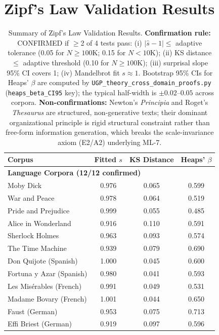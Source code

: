\documentclass[11pt]{article}
\begin{document}
\section{Zipf's Law Validation Results}
\begin{table}[h!]
    \centering
    \caption{Summary of Zipf's Law Validation Results. \textbf{Confirmation rule:} CONFIRMED if $\geq$2 of 4 tests pass: (i) $|\hat{s}-1|\leq$ adaptive tolerance (0.05 for $N\geq 100$K; 0.15 for $N<10$K); (ii) KS distance $\leq$ adaptive threshold (0.10 for $N\geq 100$K); (iii) surprisal slope 95\% CI covers 1; (iv) Mandelbrot fit $s\approx 1$. Bootstrap 95\% CIs for Heaps' $\beta$ are computed by \texttt{UGP\_theory\_cross\_domain\_proofs.py} (\texttt{heaps\_beta\_CI95} key); the typical half-width is $\pm 0.02$--$0.05$ across corpora. \textbf{Non-confirmations:} Newton's \emph{Principia} and Roget's \emph{Thesaurus} are structured, non-generative texts; their dominant organizational principle is rigid structural constraint rather than free-form information generation, which breaks the scale-invariance axiom (E2/A2) underlying ML-7.}
    \label{tab:zipf-summary}
    \tiny
    \begin{tabular}{@{}lccc@{}}
        \toprule
        \textbf{Corpus} & \textbf{Fitted $s$} & \textbf{KS Distance} & \textbf{Heaps' $\beta$} \\
        \midrule
        \multicolumn{4}{l}{\textbf{Language Corpora (12/12 confirmed)}} \\
        Moby Dick & 0.976 & 0.065 & 0.599 \\
        War and Peace & 0.978 & 0.064 & 0.519 \\
        Pride and Prejudice & 0.999 & 0.055 & 0.485 \\
        Alice in Wonderland & 0.916 & 0.110 & 0.591 \\
        Sherlock Holmes & 0.963 & 0.093 & 0.574 \\
        The Time Machine & 0.939 & 0.079 & 0.690 \\
        Don Quijote (Spanish) & 1.000 & 0.045 & 0.600 \\
        Fortuna y Azar (Spanish) & 0.980 & 0.041 & 0.593 \\
        Les Misérables (French) & 0.991 & 0.049 & 0.531 \\
        Madame Bovary (French) & 1.001 & 0.044 & 0.650 \\
        Faust (German) & 0.953 & 0.075 & 0.713 \\
        Effi Briest (German) & 0.919 & 0.097 & 0.596 \\

\end{tabular}
\end{table}
\end{document}
